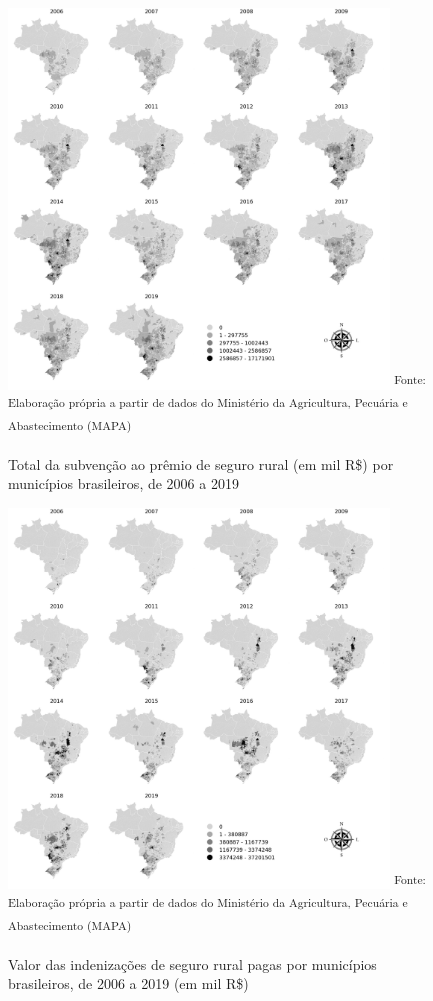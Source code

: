 \begin{figure}[H]
	\centering
	\caption{Total da subvenção ao prêmio de seguro rural (em mil R\$) por municípios brasileiros, de 2006 a 2019}
	\includegraphics[width=0.9\textwidth]{figuras/map_total_subvencao_mil.png}
	\small \textsuperscript {Fonte: Elaboração própria a partir de dados do Ministério da Agricultura, Pecuária e Abastecimento (MAPA)}
    \label{map_lisa_subvencao}
\end{figure}

\begin{figure}[H]
	\centering
	\caption{Valor das indenizações de seguro rural pagas por municípios brasileiros, de 2006 a 2019 (em mil R\$)}
	\includegraphics[width=0.9\textwidth]{figuras/map_indenizacoes_pagas_mil.png}
	\small \textsuperscript {Fonte: Elaboração própria a partir de dados do Ministério da Agricultura, Pecuária e Abastecimento (MAPA)}
    \label{map_lisa_indenizacoes}
\end{figure}


